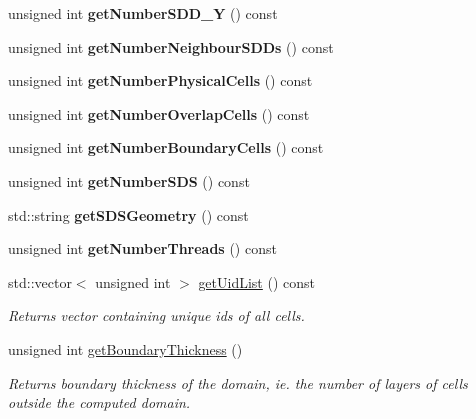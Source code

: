 \begin{DoxyCompactItemize}
\item 
\mbox{\label{classDomain_a8e8d6c959123597f6e2d8779a836d32c}} 
unsigned int {\bfseries get\+Number\+S\+D\+D\+\_\+Y} () const
\item 
\mbox{\label{classDomain_a985c94d1108a0a206f0201908d944a0d}} 
unsigned int {\bfseries get\+Number\+Neighbour\+S\+D\+Ds} () const
\item 
\mbox{\label{classDomain_a428011ce5e842c9f05545c57480ed30e}} 
unsigned int {\bfseries get\+Number\+Physical\+Cells} () const
\item 
\mbox{\label{classDomain_adbbd89acedd87b8b4814e367027551cd}} 
unsigned int {\bfseries get\+Number\+Overlap\+Cells} () const
\item 
\mbox{\label{classDomain_ab3a77c402326dc31a855125536348a6f}} 
unsigned int {\bfseries get\+Number\+Boundary\+Cells} () const
\item 
\mbox{\label{classDomain_a25e60a79720035ab95a1eb4a41efb53c}} 
unsigned int {\bfseries get\+Number\+S\+DS} () const
\item 
\mbox{\label{classDomain_a388103cf2adcc7224f77d4c26a471d6a}} 
std\+::string {\bfseries get\+S\+D\+S\+Geometry} () const
\item 
\mbox{\label{classDomain_ac1e1ec57c7c0401dbee987d1c760ced7}} 
unsigned int {\bfseries get\+Number\+Threads} () const
\item 
std\+::vector$<$ unsigned int $>$ \hyperlink{classDomain_a6f7d5f16ca53367feabc00b9efa05be8}{get\+Uid\+List} () const
\begin{DoxyCompactList}\small\item\em Returns vector containing unique ids of all cells. \end{DoxyCompactList}\item 
unsigned int \hyperlink{classDomain_aa0d225e23c6a454058a3df5b7b5973fa}{get\+Boundary\+Thickness} ()
\begin{DoxyCompactList}\small\item\em Returns boundary thickness of the domain, ie. the number of layers of cells outside the computed domain. \end{DoxyCompactList}\item 

\end{DoxyCompactItemize}
